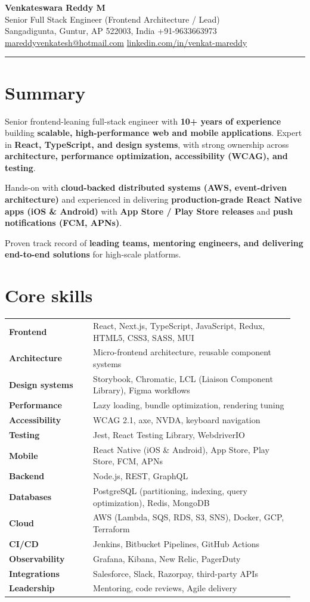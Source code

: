\documentclass[11pt,a4paper]{article}
\makeatletter
\newcommand{\resumeheader}{%
  {\LARGE\bfseries Venkateswara Reddy M}\\[0.35em]
  {\large\color{textmuted}Senior Full Stack Engineer (Frontend Architecture / Lead)}\\[0.75em]
  {\small\color{textmuted}
  Sangadigunta, Guntur, AP 522003, India \quad\textbullet\quad +91-9633663973\\
  \href{mailto:mareddyvenkatesh@hotmail.com}{mareddyvenkatesh@hotmail.com}
  \quad\textbullet\quad
  \href{https://www.linkedin.com/in/venkat-mareddy}{linkedin.com/in/venkat-mareddy}}\\[1.1em]
  {\color{accent!30}\rule{\linewidth}{0.75pt}}
}
\makeatother
\begin{document}
\resumeheader

\section{Summary}
Senior frontend-leaning full-stack engineer with \textbf{10+ years of experience} building \textbf{scalable, high-performance web and mobile applications}. Expert in \textbf{React, TypeScript, and design systems}, with strong ownership across \textbf{architecture, performance optimization, accessibility (WCAG), and testing}.

Hands-on with \textbf{cloud-backed distributed systems (AWS, event-driven architecture)} and experienced in delivering \textbf{production-grade React Native apps (iOS \& Android)} with \textbf{App Store / Play Store releases} and \textbf{push notifications (FCM, APNs)}.

Proven track record of \textbf{leading teams, mentoring engineers, and delivering end-to-end solutions} for high-scale platforms.

\section{Core skills}
\begin{tabular*}{\linewidth}{@{}p{0.28\linewidth}@{\quad}p{0.67\linewidth}@{}}
\textbf{Frontend} & React, Next.js, TypeScript, JavaScript, Redux, HTML5, CSS3, SASS, MUI \\
\textbf{Architecture} & Micro-frontend architecture, reusable component systems \\
\textbf{Design systems} & Storybook, Chromatic, LCL (Liaison Component Library), Figma workflows \\
\textbf{Performance} & Lazy loading, bundle optimization, rendering tuning \\
\textbf{Accessibility} & WCAG 2.1, axe, NVDA, keyboard navigation \\
\textbf{Testing} & Jest, React Testing Library, WebdriverIO \\
\textbf{Mobile} & React Native (iOS \& Android), App Store, Play Store, FCM, APNs \\
\textbf{Backend} & Node.js, REST, GraphQL \\
\textbf{Databases} & PostgreSQL (partitioning, indexing, query optimization), Redis, MongoDB \\
\textbf{Cloud} & AWS (Lambda, SQS, RDS, S3, SNS), Docker, GCP, Terraform \\
\textbf{CI/CD} & Jenkins, Bitbucket Pipelines, GitHub Actions \\
\textbf{Observability} & Grafana, Kibana, New Relic, PagerDuty \\
\textbf{Integrations} & Salesforce, Slack, Razorpay, third-party APIs \\
\textbf{Leadership} & Mentoring, code reviews, Agile delivery \\
\end{tabular*}
\end{document}
